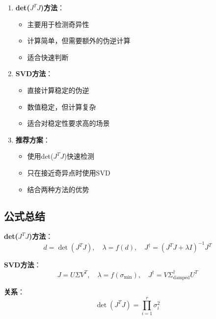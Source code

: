 \documentclass[12pt,a4paper]{article}
\begin{document}
\begin{enumerate}
\item \textbf{det($J^T J$)方法}：
\begin{itemize}
\item 主要用于检测奇异性
\item 计算简单，但需要额外的伪逆计算
\item 适合快速判断
\end{itemize}

\item \textbf{SVD方法}：
\begin{itemize}
\item 直接计算稳定的伪逆
\item 数值稳定，但计算复杂
\item 适合对稳定性要求高的场景
\end{itemize}

\item \textbf{推荐方案}：
\begin{itemize}
\item 使用det($J^T J$)快速检测
\item 只在接近奇异点时使用SVD
\item 结合两种方法的优势
\end{itemize}
\end{enumerate}

\subsection{公式总结}

\textbf{det($J^T J$)方法}：
\begin{equation}
d = \det(J^T J), \quad \lambda = f(d), \quad J^{\dagger} = (J^T J + \lambda I)^{-1}J^T
\end{equation}

\textbf{SVD方法}：
\begin{equation}
J = U\Sigma V^T, \quad \lambda = f(\sigma_{\min}), \quad J^{\dagger} = V\Sigma^{\dagger}_{\text{damped}}U^T
\end{equation}

\textbf{关系}：
\begin{equation}
\det(J^T J) = \prod_{i=1}^r \sigma_i^2
\end{equation}
\end{document}
